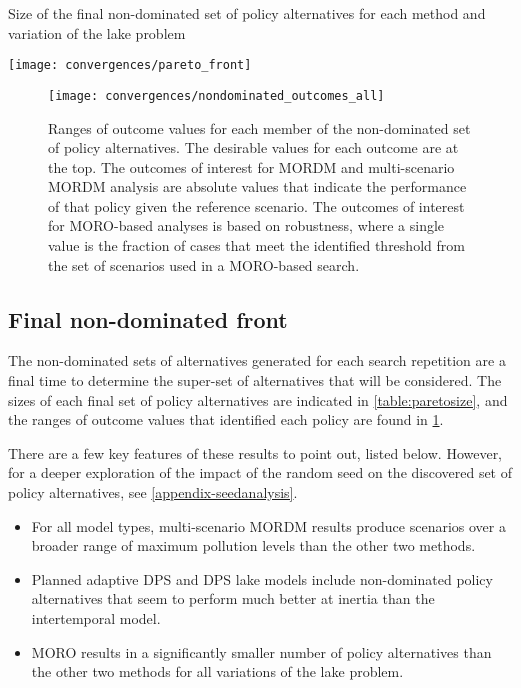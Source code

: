     \begin{table}[ht]
        \centering
        \caption[Size of non-dominated policy alternative sets]{Size of the final non-dominated set of policy alternatives for each method and variation of the lake problem}
        \label{table:paretosize}
        \texttt{[image: convergences/pareto\_front]}
    \end{table}
    
    \begin{figure}[ht]
        \centering
        \texttt{[image: convergences/nondominated\_outcomes\_all]}
        \caption[Outcome value ranges across all pairings]{Ranges of outcome values for each member of the non-dominated set of policy alternatives. The desirable values for each outcome are at the top. The outcomes of interest for MORDM and multi-scenario MORDM analysis are absolute values that indicate the performance of that policy given the reference scenario. The outcomes of interest for MORO-based analyses is based on robustness, where a single value is the fraction of cases that meet the identified threshold from the set of scenarios used in a MORO-based search.}
        \label{fig:nondominated-outcomes}
    \end{figure}

    \subsection{Final non-dominated front}
    The non-dominated sets of alternatives generated for each search repetition are a final time to determine the super-set of alternatives that will be considered. The sizes of each final set of policy alternatives are indicated in \cref{table:paretosize}, and the ranges of outcome values that identified each policy are found in \cref{fig:nondominated-outcomes}. 
    
    There are a few key features of these results to point out, listed below. However, for a deeper exploration of the impact of the random seed on the discovered set of policy alternatives, see \cref{appendix-seedanalysis}. 
    
    \begin{itemize}
        \item For all model types, multi-scenario MORDM results produce scenarios over a broader range of maximum pollution levels than the other two methods. 
        \item Planned adaptive DPS and DPS lake models include non-dominated policy alternatives that seem to perform much better at inertia than the intertemporal model. 
        \item MORO results in a significantly smaller number of policy alternatives than the other two methods for all variations of the lake problem. 
    \end{itemize}

